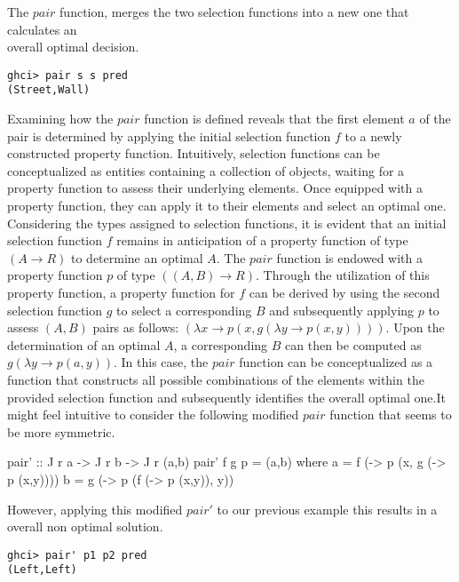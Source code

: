 \documentclass[runningheads]{llncs}
\begin{document}
The \(pair\) function, merges the two selection functions into a new one
that calculates an\\
overall optimal decision.

\begin{verbatim}
ghci> pair s s pred
(Street,Wall)
\end{verbatim}

Examining how the \(pair\) function is defined reveals that the first
element \(a\) of the pair is determined by applying the initial
selection function \(f\) to a newly constructed property function.
Intuitively, selection functions can be conceptualized as entities
containing a collection of objects, waiting for a property function to
assess their underlying elements. Once equipped with a property
function, they can apply it to their elements and select an optimal one.
Considering the types assigned to selection functions, it is evident
that an initial selection function \(f\) remains in anticipation of a
property function of type \((A \rightarrow R)\) to determine an optimal
\(A\). The \(pair\) function is endowed with a property function \(p\)
of type \(((A,B) \rightarrow R)\). Through the utilization of this
property function, a property function for \(f\) can be derived by using
the second selection function \(g\) to select a corresponding \(B\) and
subsequently applying \(p\) to assess \((A,B)\) pairs as follows:
\((\lambda x \rightarrow p (x, g (\lambda y \rightarrow p (x,y))))\).
Upon the determination of an optimal \(A\), a corresponding \(B\) can
then be computed as \(g (\lambda y \rightarrow p (a,y))\). In this case,
the \(pair\) function can be conceptualized as a function that
constructs all possible combinations of the elements within the provided
selection function and subsequently identifies the overall optimal
one.It might feel intuitive to consider the following modified \(pair\)
function that seems to be more symmetric.

\begin{code}
pair' :: J r a -> J r b -> J r (a,b)
pair' f g p = (a,b)
  where
      a = f (\x -> p (x, g (\y -> p (x,y))))
      b = g (\y -> p (f (\x -> p (x,y)), y))
\end{code}

However, applying this modified \(pair'\) to our previous example this
results in a overall non optimal solution.

\begin{verbatim}
ghci> pair' p1 p2 pred
(Left,Left)
\end{verbatim}
\end{document}
